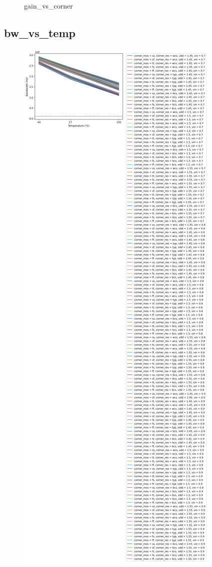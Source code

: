 \documentclass[
  a4paper,
  DIV=11,
  numbers=noendperiod]{scrartcl}
\begin{document}
\begin{tcolorbox}
\begin{figure}[H]
{}

\caption{gain\_vs\_corner}

\end{figure}%

\subsection*{bw\_vs\_temp}\label{bw_vs_temp-1}

\begin{figure}[H]

{\centering \includegraphics{./cace/_docs/ota-improved/schematic/bw_vs_temp.png}

}
\end{figure}
\end{tcolorbox}
\end{document}
